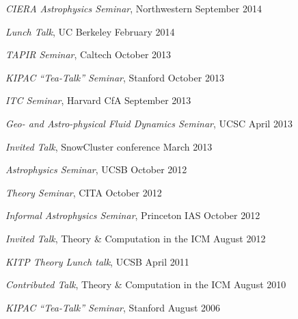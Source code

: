 \begin{talkenum}
\item \textit{CIERA Astrophysics Seminar}, Northwestern \hspace*{\fill} September 2014

\item \textit{Lunch Talk}, UC Berkeley \hspace*{\fill} February 2014

\item \textit{TAPIR Seminar}, Caltech \hspace*{\fill} October 2013

\item \textit{KIPAC “Tea-Talk” Seminar}, Stanford \hspace*{\fill} October 2013

\item \textit{ITC Seminar}, Harvard CfA \hspace*{\fill} September 2013

\item \textit{Geo- and Astro-physical Fluid Dynamics Seminar}, UCSC \hspace*{\fill} April 2013

\item \textit{Invited Talk}, SnowCluster conference \hspace*{\fill} March 2013

\item \textit{Astrophysics Seminar}, UCSB \hspace*{\fill} October 2012

\item \textit{Theory Seminar}, CITA \hspace*{\fill} October 2012

\item \textit{Informal Astrophysics Seminar}, Princeton IAS \hspace*{\fill} October 2012

\item \textit{Invited Talk}, Theory \& Computation in the ICM \hspace*{\fill} August 2012

\item \textit{KITP Theory Lunch talk}, UCSB \hspace*{\fill} April 2011

\item \textit{Contributed Talk}, Theory \& Computation in the ICM \hspace*{\fill} August 2010

\item \textit{KIPAC “Tea-Talk” Seminar}, Stanford \hspace*{\fill} August 2006

\end{talkenum}
